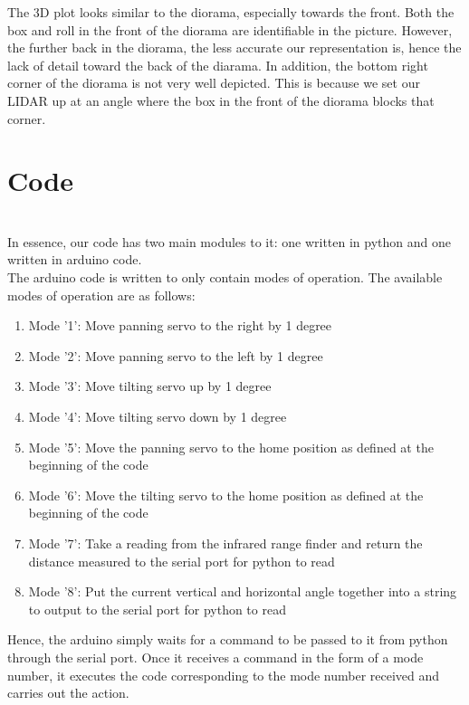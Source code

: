 \documentclass{article}
\begin{document}
The 3D plot looks similar to the diorama, especially towards the front. Both the box and roll in the front of the diorama are identifiable in the picture. However, the further back in the diorama, the less accurate our representation is, hence the lack of detail toward the back of the diarama. In addition, the bottom right corner of the diorama is not very well depicted. This is because we set our LIDAR up at an angle where the box in the front of the diorama blocks that corner.


\section{Code} \ \\
In essence, our code has two main modules to it: one written in python and one written in arduino code. \\

The arduino code is written to only contain modes of operation. The available modes of operation are as follows:

\begin{enumerate}

\item Mode '1': Move panning servo to the right by 1 degree
\item Mode '2': Move panning servo to the left by 1 degree
\item Mode '3': Move tilting servo up by 1 degree
\item Mode '4': Move tilting servo down by 1 degree
\item Mode '5': Move the panning servo to the home position as defined at the beginning of the code
\item Mode '6': Move the tilting servo to the home position as defined at the beginning of the code
\item Mode '7': Take a reading from the infrared range finder and return the distance measured to the serial port for python to read
\item Mode '8': Put the current vertical and horizontal angle together into a string to output to the serial port for python to read

\end{enumerate}


Hence, the arduino simply waits for a command to be passed to it from python through the serial port. Once it receives a command in the form of a mode number, it executes the code corresponding to the mode number received and carries out the action. \\
\end{document}
